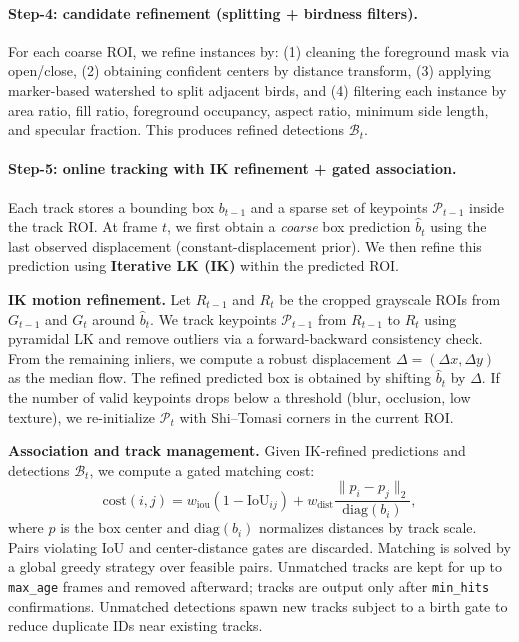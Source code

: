 \paragraph{Step-4: candidate refinement (splitting + birdness filters).}
For each coarse ROI, we refine instances by:
(1) cleaning the foreground mask via open/close,
(2) obtaining confident centers by distance transform,
(3) applying marker-based watershed to split adjacent birds,
and (4) filtering each instance by area ratio, fill ratio, foreground occupancy, aspect ratio, minimum side length, and specular fraction.
This produces refined detections $\mathcal{B}_t$.

\paragraph{Step-5: online tracking with IK refinement + gated association.}
Each track stores a bounding box $b_{t-1}$ and a sparse set of keypoints $\mathcal{P}_{t-1}$ inside the track ROI.
At frame $t$, we first obtain a \emph{coarse} box prediction $\hat{b}_t$ using the last observed displacement (constant-displacement prior).
We then refine this prediction using \textbf{Iterative LK (IK)} within the predicted ROI.

\textbf{IK motion refinement.}
Let $R_{t-1}$ and $R_t$ be the cropped grayscale ROIs from $G_{t-1}$ and $G_t$ around $\hat{b}_t$.
We track keypoints $\mathcal{P}_{t-1}$ from $R_{t-1}$ to $R_t$ using pyramidal LK and remove outliers via a forward-backward consistency check.
From the remaining inliers, we compute a robust displacement $\Delta=(\Delta x,\Delta y)$ as the median flow.
The refined predicted box is obtained by shifting $\hat{b}_t$ by $\Delta$.
If the number of valid keypoints drops below a threshold (blur, occlusion, low texture), we re-initialize $\mathcal{P}_{t}$ with Shi--Tomasi corners in the current ROI.

\textbf{Association and track management.}
Given IK-refined predictions and detections $\mathcal{B}_t$, we compute a gated matching cost:
\[
\text{cost}(i,j)=w_\text{iou}(1-\text{IoU}_{ij})
+ w_\text{dist}\frac{\|p_i-p_j\|_2}{\text{diag}(b_i)},
\]
where $p$ is the box center and $\text{diag}(b_i)$ normalizes distances by track scale.
Pairs violating IoU and center-distance gates are discarded.
Matching is solved by a global greedy strategy over feasible pairs.
Unmatched tracks are kept for up to \texttt{max\_age} frames and removed afterward; tracks are output only after \texttt{min\_hits} confirmations.
Unmatched detections spawn new tracks subject to a birth gate to reduce duplicate IDs near existing tracks.

